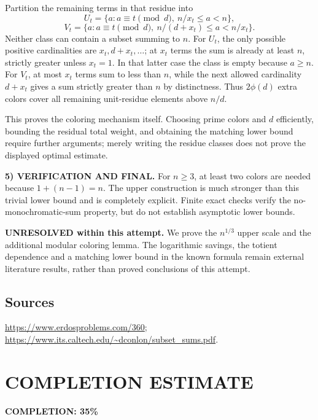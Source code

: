 Partition the remaining terms in that residue into
\[
 U_t=\{a:a\equiv t\pmod d,\ n/x_t\le a<n\},
\]
\[
 V_t=\{a:a\equiv t\pmod d,\ n/(d+x_t)\le a<n/x_t\}.
\]
Neither class can contain a subset summing to $n$. For $U_t$, the only possible positive cardinalities are $x_t,d+x_t,\ldots$; at $x_t$ terms the sum is already at least $n$, strictly greater unless $x_t=1$. In that latter case the class is empty because $a\ge n$. For $V_t$, at most $x_t$ terms sum to less than $n$, while the next allowed cardinality $d+x_t$ gives a sum strictly greater than $n$ by distinctness. Thus $2\phi(d)$ extra colors cover all remaining unit-residue elements above $n/d$.

This proves the coloring mechanism itself. Choosing prime colors and $d$ efficiently, bounding the residual total weight, and obtaining the matching lower bound require further arguments; merely writing the residue classes does not prove the displayed optimal estimate.

\noindent\textbf{5) VERIFICATION AND FINAL.}
For $n\ge3$, at least two colors are needed because $1+(n-1)=n$. The upper construction is much stronger than this trivial lower bound and is completely explicit. Finite exact checks verify the no-monochromatic-sum property, but do not establish asymptotic lower bounds.

\textbf{UNRESOLVED within this attempt.} We prove the $n^{1/3}$ upper scale and the additional modular coloring lemma. The logarithmic savings, the totient dependence and a matching lower bound in the known formula remain external literature results, rather than proved conclusions of this attempt.

\subsection*{Sources}
\url{https://www.erdosproblems.com/360}; \url{https://www.its.caltech.edu/~dconlon/subset_sums.pdf}.

\section{COMPLETION ESTIMATE}
\textbf{COMPLETION: 35\%}
